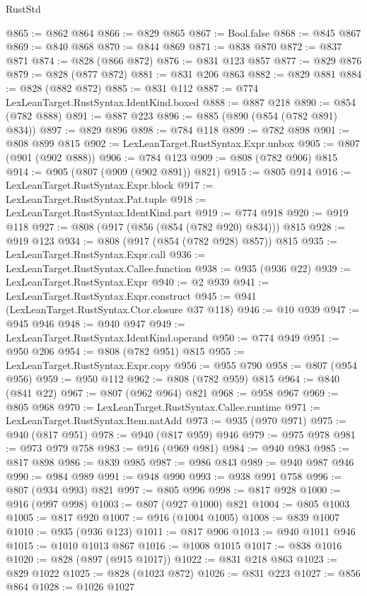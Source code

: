 \begin{lexlean}{RustStd}
\begin{coremodule}
@865 := @862 @864
@866 := @829 @865
@867 := Bool.false
@868 := @845 @867
@869 := @840 @868
@870 := @844 @869
@871 := @838 @870
@872 := @837 @871
@874 := @828 (@866 @872)
@876 := @831 @123 @857
@877 := @829 @876
@879 := @828 (@877 @872)
@881 := @831 @206 @863
@882 := @829 @881
@884 := @828 (@882 @872)
@885 := @831 @112
@887 := @774 LexLeanTarget.RustSyntax.IdentKind.boxed
@888 := @887 @218
@890 := @854 (@782 @888)
@891 := @887 @223
@896 := @885 (@890 (@854 (@782 @891) @834))
@897 := @829 @896
@898 := @784 @118
@899 := @782 @898
@901 := @808 @899 @815
@902 := LexLeanTarget.RustSyntax.Expr.unbox
@905 := @807 (@901 (@902 @888))
@906 := @784 @123
@909 := @808 (@782 @906) @815
@914 := @905 (@807 (@909 (@902 @891)) @821)
@915 := @805 @914
@916 := LexLeanTarget.RustSyntax.Expr.block
@917 := LexLeanTarget.RustSyntax.Pat.tuple
@918 := LexLeanTarget.RustSyntax.IdentKind.part
@919 := @774 @918
@920 := @919 @118
@927 := @808 (@917 (@856 (@854 (@782 @920) @834))) @815
@928 := @919 @123
@934 := @808 (@917 (@854 (@782 @928) @857)) @815
@935 := LexLeanTarget.RustSyntax.Expr.call
@936 := LexLeanTarget.RustSyntax.Callee.function
@938 := @935 (@936 @22)
@939 := LexLeanTarget.RustSyntax.Expr
@940 := @2 @939
@941 := LexLeanTarget.RustSyntax.Expr.construct
@945 := @941 (LexLeanTarget.RustSyntax.Ctor.closure @37 @118)
@946 := @10 @939
@947 := @945 @946
@948 := @940 @947
@949 := LexLeanTarget.RustSyntax.IdentKind.operand
@950 := @774 @949
@951 := @950 @206
@954 := @808 (@782 @951) @815
@955 := LexLeanTarget.RustSyntax.Expr.copy
@956 := @955 @790
@958 := @807 (@954 @956)
@959 := @950 @112
@962 := @808 (@782 @959) @815
@964 := @840 (@841 @22)
@967 := @807 (@962 @964) @821
@968 := @958 @967
@969 := @805 @968
@970 := LexLeanTarget.RustSyntax.Callee.runtime
@971 := LexLeanTarget.RustSyntax.Item.natAdd
@973 := @935 (@970 @971)
@975 := @940 (@817 @951)
@978 := @940 (@817 @959) @946
@979 := @975 @978
@981 := @973 @979 @758
@983 := @916 (@969 @981)
@984 := @940 @983
@985 := @817 @898
@986 := @839 @985
@987 := @986 @843
@989 := @940 @987 @946
@990 := @984 @989
@991 := @948 @990
@993 := @938 @991 @758
@996 := @807 (@934 @993) @821
@997 := @805 @996
@998 := @817 @928
@1000 := @916 (@997 @998)
@1003 := @807 (@927 @1000) @821
@1004 := @805 @1003
@1005 := @817 @920
@1007 := @916 (@1004 @1005)
@1008 := @839 @1007
@1010 := @935 (@936 @123)
@1011 := @817 @906
@1013 := @940 @1011 @946
@1015 := @1010 @1013 @867
@1016 := @1008 @1015
@1017 := @838 @1016
@1020 := @828 (@897 (@915 @1017))
@1022 := @831 @218 @863
@1023 := @829 @1022
@1025 := @828 (@1023 @872)
@1026 := @831 @223
@1027 := @856 @864
@1028 := @1026 @1027

\end{coremodule}
\end{lexlean}
